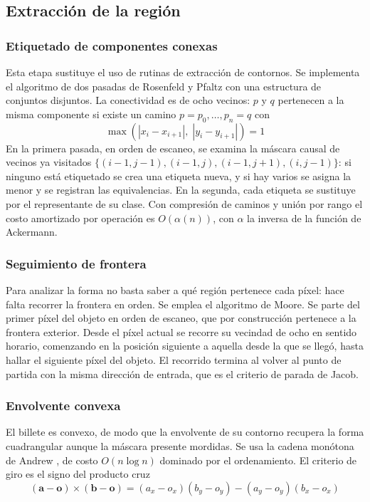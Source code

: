 \documentclass[conference]{IEEEtran}
\begin{document}
\subsection{Extracción de la región}

\subsubsection{Etiquetado de componentes conexas}
Esta etapa sustituye el uso de rutinas de extracción de contornos. Se
implementa el algoritmo de dos pasadas de Rosenfeld y Pfaltz
\cite{rosenfeld1966} con una estructura de conjuntos disjuntos. La
conectividad es de ocho vecinos: $p$ y $q$ pertenecen a la misma
componente si existe un camino $p=p_0,\dots,p_n=q$ con
\begin{equation}
\max\left(|x_i-x_{i+1}|,\;|y_i-y_{i+1}|\right) = 1
\end{equation}
En la primera pasada, en orden de escaneo, se examina la máscara causal
de vecinos ya visitados
$\{(i{-}1,j{-}1),(i{-}1,j),(i{-}1,j{+}1),(i,j{-}1)\}$: si ninguno está
etiquetado se crea una etiqueta nueva, y si hay varios se asigna la
menor y se registran las equivalencias. En la segunda, cada etiqueta se
sustituye por el representante de su clase. Con compresión de caminos y
unión por rango el costo amortizado por operación es $O(\alpha(n))$,
con $\alpha$ la inversa de la función de Ackermann.

\subsubsection{Seguimiento de frontera}
Para analizar la forma no basta saber a qué región pertenece cada
píxel: hace falta recorrer la frontera en orden. Se emplea el algoritmo
de Moore. Se parte del primer píxel del objeto en orden de escaneo, que
por construcción pertenece a la frontera exterior. Desde el píxel
actual se recorre su vecindad de ocho en sentido horario, comenzando en
la posición siguiente a aquella desde la que se llegó, hasta hallar el
siguiente píxel del objeto. El recorrido termina al volver al punto de
partida con la misma dirección de entrada, que es el criterio de parada
de Jacob.

\subsubsection{Envolvente convexa}
El billete es convexo, de modo que la envolvente de su contorno
recupera la forma cuadrangular aunque la máscara presente mordidas. Se
usa la cadena monótona de Andrew \cite{andrew1979}, de costo
$O(n\log n)$ dominado por el ordenamiento. El criterio de giro es el
signo del producto cruz
\begin{equation}
(\mathbf{a}-\mathbf{o})\times(\mathbf{b}-\mathbf{o}) =
(a_x-o_x)(b_y-o_y)-(a_y-o_y)(b_x-o_x)
\end{equation}
\end{document}
